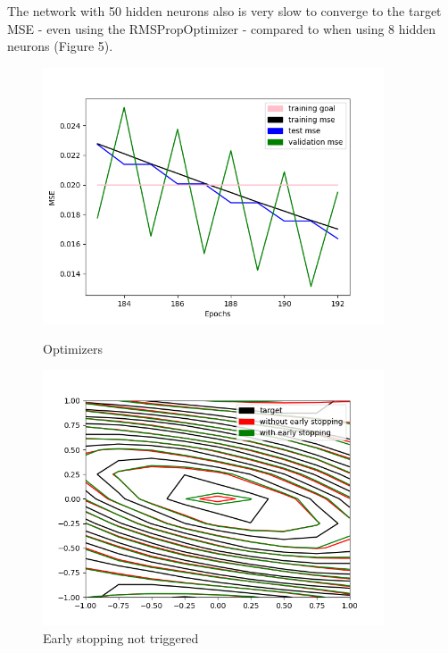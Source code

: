 \documentclass[11pt]{article}
\begin{document}
\begin{enumerate}
The network with 50 hidden neurons also is very slow to converge to the target MSE - even using the RMSPropOptimizer - compared to when using 8 hidden neurons (Figure 5).\newline

\begin{figure}[h!]
    \centering
    \begin{minipage}{0.45\textwidth}
        \centering
        \includegraphics[width=0.9\textwidth]{q1c-3} %
        \caption{Optimizers}
    \end{minipage}\hfill
    \begin{minipage}{0.45\textwidth}
        \centering
        \includegraphics[width=0.9\textwidth]{q1c-32} %
        \caption{Early stopping not triggered}
    \end{minipage}
\end{figure}


\end{enumerate}
\end{document}
